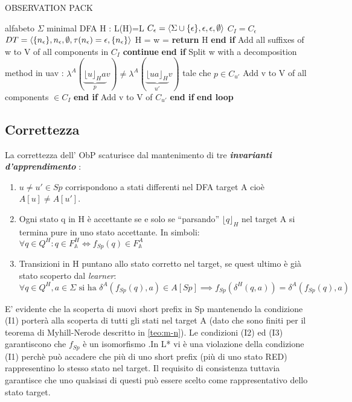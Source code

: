 \begin{algorithm}
\caption{OBSERVATION PACK}\label{alg:obpp}
\begin{algorithmic}[1]
\Statex
\Input alfabeto $\Sigma$ 
\Output minimal DFA H : L(H)=\ac{L}  
\State $C_{\epsilon}=\Braket{\Sigma \cup \{\epsilon\},\epsilon,\epsilon,\emptyset}$
\State $C_I = C_{\epsilon}$ 
    \State $DT = \Braket{\{n_{\epsilon}\},n_{\epsilon},\emptyset,\tau(n_{\epsilon})=\epsilon,\{n_{\epsilon}\}}$
    \Loop
    \State H = 
    \State w = 
    \State \textbf{return} H 
    \EndIf
    \State \textbf{end if}
    \State Add all suffixes of w to V of all components in $C_I$
    \State \textbf{continue}
    \EndIf
    \State \textbf{end if}
    \State Split w with a decomposition method in uav : $\lambda^{A}(\underbrace{\lfloor u \rfloor_{H}a}_{p} v) \neq \lambda^{A}(\underbrace{\lfloor ua
     \rfloor_{H}}_{u'}v)$
     \Statex \quad \: tale che $p \in C_{u'}$
    \State Add v to V of all components $\in C_I$ \label{lin:addsuffixes}
    \EndIf
    \State \textbf{end if}
    \State Add v to V of $ C_{u'}$
    \EndIf
    \State \textbf{end if}
    \EndLoop
    \State \textbf{end loop}
     
\end{algorithmic}
\end{algorithm}

\subsection{Correttezza}
\label{sub:corret}
La correttezza dell' \ac{ObP} scaturisce dal mantenimento di tre \textit{\textbf{invarianti d'apprendimento}} :
\begin{enumerate}[label=\textbf{{(I}\arabic*{)}}]
  \item $u \neq u' \in Sp$ corrispondono a stati differenti nel \ac{DFA} target A cioè $A[u] \neq A[u']$.
  \item Ogni stato q in \ac{H} è accettante se e solo se ``parsando'' $\lfloor q \rfloor_{H}$ nel target A si termina pure in uno stato accettante. In simboli: $\forall q \in Q^{H} : q \in  F_{\mathbb{A}}^{H} \Leftrightarrow f_{Sp}(q) \in F_{\mathbb{A}}^{A}$
  \item Transizioni in \ac{H} puntano allo stato corretto nel target, se quest ultimo è già stato scoperto dal \textit{learner}: $\forall q \in Q^{H}, a \in \Sigma \text{ si ha } \delta^{A}(f_{Sp}(q),a) \in A[Sp] \implies f_{Sp}(\delta^{H}(q,a)) = \delta^{A}(f_{Sp}(q),a)$
\end{enumerate}
E' evidente che la scoperta di nuovi short prefix in Sp mantenendo la condizione (I1)  porterà alla scoperta di tutti gli stati nel target A (dato che sono finiti per il teorema di Myhill-Nerode descritto in \ref{teo:m-n}). Le condizioni (I2) ed (I3) garantiscono che $f_{Sp}$ è un isomorfismo .In L* vi è una violazione della condizione (I1) perchè può accadere che più di uno short prefix (più di uno stato RED) rappresentino lo stesso stato nel target. Il requisito di consistenza tuttavia garantisce che uno qualsiasi di questi può essere scelto come rappresentativo dello stato target.\\

